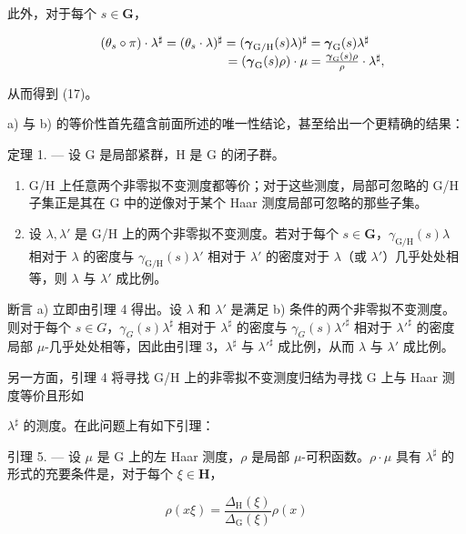 此外，对于每个 \(s \in \mathbf{G}\)，

\[
\begin{array}{r l} & {(\theta_ {s} \circ \pi) \cdot \lambda^ {\sharp} = (\theta_ {s} \cdot \lambda) ^ {\sharp} = (\boldsymbol {\gamma} _ {\mathrm{G/H}} (s) \lambda) ^ {\sharp} = \boldsymbol {\gamma} _ {\mathrm{G}} (s) \lambda^ {\sharp}} \\ & {\qquad \qquad \qquad \qquad \qquad = (\boldsymbol {\gamma} _ {\mathrm{G}} (s) \rho) \cdot \mu = \frac {\boldsymbol {\gamma} _ {\mathrm{G}} (s) \rho}{\rho} \cdot \lambda^ {\sharp},} \end{array}
\]

从而得到 (17)。

a) 与 b) 的等价性首先蕴含前面所述的唯一性结论，甚至给出一个更精确的结果：

定理 1. --- 设 G 是局部紧群，H 是 G 的闭子群。

\begin{enumerate}
\def\labelenumi{\alph{enumi})}
\item
  G/H 上任意两个非零拟不变测度都等价；对于这些测度，局部可忽略的 G/H 子集正是其在 G 中的逆像对于某个 Haar 测度局部可忽略的那些子集。
\item
  设 \(\lambda, \lambda'\) 是 G/H 上的两个非零拟不变测度。若对于每个 \(s \in \mathbf{G}\)，\(\gamma_{\mathrm{G / H}}(s)\lambda\) 相对于 \(\lambda\) 的密度与 \(\gamma_{\mathrm{G / H}}(s)\lambda'\) 相对于 \(\lambda'\) 的密度对于 \(\lambda\)（或 \(\lambda'\)）几乎处处相等，则 \(\lambda\) 与 \(\lambda'\) 成比例。
\end{enumerate}

断言 a) 立即由引理 4 得出。设 \(\lambda\) 和 \(\lambda'\) 是满足 b) 条件的两个非零拟不变测度。则对于每个 \(s \in G\)，\(\gamma_G(s)\lambda^\sharp\) 相对于 \(\lambda^\sharp\) 的密度与 \(\gamma_G(s)\lambda'^\sharp\) 相对于 \(\lambda'^\sharp\) 的密度局部 \(\mu\)-几乎处处相等，因此由引理 3，\(\lambda^\sharp\) 与 \(\lambda'^\sharp\) 成比例，从而 \(\lambda\) 与 \(\lambda'\) 成比例。

另一方面，引理 4 将寻找 G/H 上的非零拟不变测度归结为寻找 G 上与 Haar 测度等价且形如

\(\lambda^{\sharp}\) 的测度。在此问题上有如下引理：

引理 5. --- 设 \(\mu\) 是 G 上的左 Haar 测度，\(\rho\) 是局部 \(\mu\)-可积函数。\(\rho \cdot \mu\) 具有 \(\lambda^{\sharp}\) 的形式的充要条件是，对于每个 \(\xi \in \mathbf{H}\)，

\[
\rho (x \xi) = \frac {\Delta_ {\mathrm{H}} (\xi)}{\Delta_ {\mathrm{G}} (\xi)} \rho (x)\tag{18}
\]

